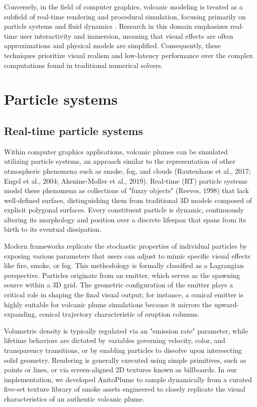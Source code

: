 Conversely, in the field of computer graphics, volcanic modeling is treated as a subfield of real-time rendering and procedural simulation, focusing primarily on particle systems and fluid dynamics \cite{stora1999animating, roth1995visualization, lastic2022interactive, li2023synthesizing, pretorius2024volcanic}.
Research in this domain emphasizes real-time user interactivity and immersion, meaning that visual effects are often approximations and physical models are simplified.
Consequently, these techniques prioritize visual realism and low-latency performance over the complex computations found in traditional numerical solvers.

\section{Particle systems}

\subsection{Real-time particle systems}
Within computer graphics applications, volcanic plumes can be simulated utilizing particle systems, an approach similar to the representation of other atmospheric phenomena such as smoke, fog, and clouds (Rautenhaus et al., 2017; Engel et al., 2004; Akenine-Moller et al., 2019). 
Real-time (RT) particle systems model these phenomena as collections of "fuzzy objects" (Reeves, 1998) that lack well-defined surface, distinguishing them from traditional 3D models composed of explicit polygonal surfaces. 
Every constituent particle is dynamic, continuously altering its morphology and position over a discrete lifespan that spans from its birth to its eventual dissipation.

Modern frameworks replicate the stochastic properties of individual particles by exposing various parameters that users can adjust to mimic specific visual effects like fire, smoke, or fog. 
This methodology is formally classified as a Lagrangian perspective. 
Particles originate from an emitter, which serves as the spawning source within a 3D grid. 
The geometric configuration of the emitter plays a critical role in shaping the final visual output; for instance, a conical emitter is highly suitable for volcanic plume simulations because it mirrors the upward-expanding, conical trajectory characteristic of eruption columns.

Volumetric density is typically regulated via an "emission rate" parameter, while lifetime behaviors are dictated by variables governing velocity, color, and transparency transitions, or by enabling particles to dissolve upon intersecting solid geometry. 
Rendering is generally executed using simple primitives, such as points or lines, or via screen-aligned 2D textures known as billboards. In our implementation, we developed AnitoPlume to sample dynamically from a curated five-set texture library of smoke assets engineered to closely replicate the visual characteristics of an authentic volcanic plume.

